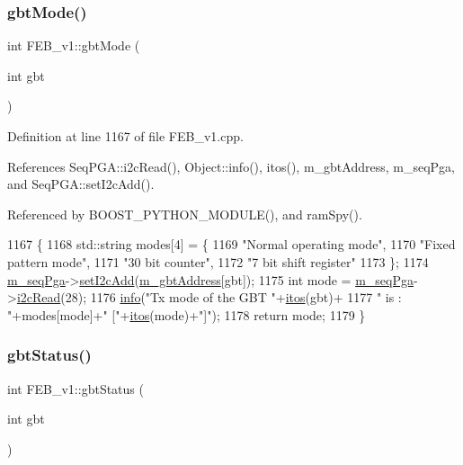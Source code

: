 \subsubsection{\texorpdfstring{gbt\+Mode()}{gbtMode()}}
{\footnotesize\ttfamily int F\+E\+B\+\_\+v1\+::gbt\+Mode (\begin{DoxyParamCaption}\item[{int}]{gbt }\end{DoxyParamCaption})}



Definition at line 1167 of file F\+E\+B\+\_\+v1.\+cpp.



References Seq\+P\+G\+A\+::i2c\+Read(), Object\+::info(), itos(), m\+\_\+gbt\+Address, m\+\_\+seq\+Pga, and Seq\+P\+G\+A\+::set\+I2c\+Add().



Referenced by B\+O\+O\+S\+T\+\_\+\+P\+Y\+T\+H\+O\+N\+\_\+\+M\+O\+D\+U\+L\+E(), and ram\+Spy().


\begin{DoxyCode}
1167                             \{
1168   std::string modes[4] = \{
1169     \textcolor{stringliteral}{"Normal operating mode"},
1170     \textcolor{stringliteral}{"Fixed pattern mode"},
1171     \textcolor{stringliteral}{"30 bit counter"},
1172     \textcolor{stringliteral}{"7 bit shift register"}
1173   \};
1174   \hyperlink{classFEB__v1_a6c7804ac86796f233a8393043adf2e77}{m\_seqPga}->\hyperlink{classSeqPGA_a4ef334e4d2cb417b49033dce951728cd}{setI2cAdd}(\hyperlink{classFEB__v1_ac625855df976f16694178f1a4c0eef1e}{m\_gbtAddress}[gbt]);
1175   \textcolor{keywordtype}{int} mode = \hyperlink{classFEB__v1_a6c7804ac86796f233a8393043adf2e77}{m\_seqPga}->\hyperlink{classSeqPGA_a7cd344df2be99f3a02b487f80e87b27e}{i2cRead}(28);
1176   \hyperlink{classObject_a644fd329ea4cb85f54fa6846484b84a8}{info}(\textcolor{stringliteral}{"Tx mode of the GBT "}+\hyperlink{Tools_8h_af330027dbdafb9a30768b3613c553e60}{itos}(gbt)+
1177        \textcolor{stringliteral}{" is : "}+modes[mode]+\textcolor{stringliteral}{" ["}+\hyperlink{Tools_8h_af330027dbdafb9a30768b3613c553e60}{itos}(mode)+\textcolor{stringliteral}{"]"});
1178   \textcolor{keywordflow}{return} mode; 
1179 \}
\end{DoxyCode}
\mbox{\label{classFEB__v1_a7b47a1b2c7af459b211eed59f4dbe9a7}} 
\subsubsection{\texorpdfstring{gbt\+Status()}{gbtStatus()}}
{\footnotesize\ttfamily int F\+E\+B\+\_\+v1\+::gbt\+Status (\begin{DoxyParamCaption}\item[{int}]{gbt }\end{DoxyParamCaption})}



